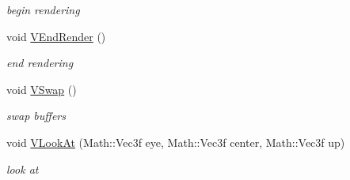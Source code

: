 \begin{DoxyCompactItemize}
\begin{DoxyCompactList}\small\item\em begin rendering \item\end{DoxyCompactList}\item 
\hypertarget{classPlatform_1_1Renderer_1_1RendererGLX_a409ab2a18ef47b8d1da2f1d1ec299d59}{
void \hyperlink{classPlatform_1_1Renderer_1_1RendererGLX_a409ab2a18ef47b8d1da2f1d1ec299d59}{VEndRender} ()}
\label{classPlatform_1_1Renderer_1_1RendererGLX_a409ab2a18ef47b8d1da2f1d1ec299d59}

\begin{DoxyCompactList}\small\item\em end rendering \item\end{DoxyCompactList}\item 
\hypertarget{classPlatform_1_1Renderer_1_1RendererGLX_a2e75f42683d129a369e011882ae7a59c}{
void \hyperlink{classPlatform_1_1Renderer_1_1RendererGLX_a2e75f42683d129a369e011882ae7a59c}{VSwap} ()}
\label{classPlatform_1_1Renderer_1_1RendererGLX_a2e75f42683d129a369e011882ae7a59c}

\begin{DoxyCompactList}\small\item\em swap buffers \item\end{DoxyCompactList}\item 
\hypertarget{classPlatform_1_1Renderer_1_1RendererGLX_ab418011356b094e8beaa80688eb0dad4}{
void \hyperlink{classPlatform_1_1Renderer_1_1RendererGLX_ab418011356b094e8beaa80688eb0dad4}{VLookAt} (Math::Vec3f eye, Math::Vec3f center, Math::Vec3f up)}
\label{classPlatform_1_1Renderer_1_1RendererGLX_ab418011356b094e8beaa80688eb0dad4}

\begin{DoxyCompactList}\small\item\em look at \item\end{DoxyCompactList}\end{DoxyCompactItemize}
